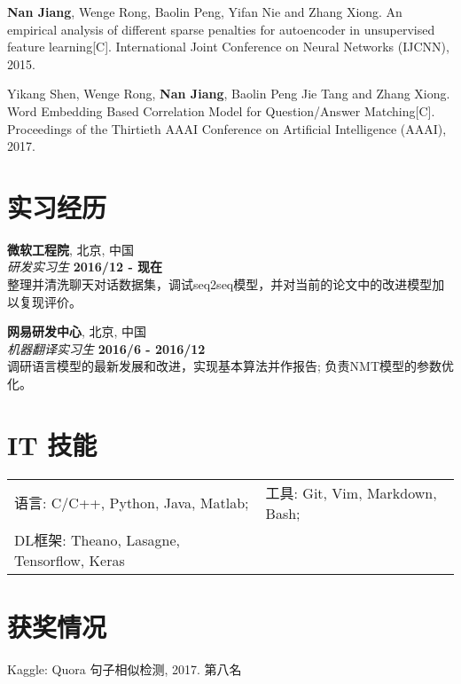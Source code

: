 \documentclass[margin,line]{resume}
\begin{document}
\begin{resume}
\textbf{Nan Jiang}, Wenge Rong, Baolin Peng, Yifan Nie and Zhang Xiong. An empirical analysis of different sparse penalties for autoencoder in unsupervised feature learning[C]. International Joint Conference on Neural Networks (IJCNN), 2015.

Yikang Shen, Wenge Rong, \textbf{Nan Jiang}, Baolin Peng Jie Tang and Zhang Xiong. Word Embedding Based Correlation Model for Question/Answer Matching[C]. Proceedings of the Thirtieth {AAAI} Conference on Artificial Intelligence (AAAI), 2017.





\section{实习经历}
{\bf 微软工程院}, 北京, 中国 \\
{\em 研发实习生} \hfill {\bf  2016/12 - 现在}\\
整理并清洗聊天对话数据集，调试seq2seq模型，并对当前的论文中的改进模型加以复现评价。
\vspace{-0.5em}

{\bf 网易研发中心}, 北京, 中国 \\
{\em 机器翻译实习生} \hfill {\bf  2016/6 - 2016/12}\\
调研语言模型的最新发展和改进，实现基本算法并作报告; 负责NMT模型的参数优化。








\section{IT 技能}
\begin{tabular}{@{}p{3in}p{4in}}
语言: C/C++, Python, Java, Matlab;& 工具: Git, Vim, Markdown, Bash; \\
DL框架: Theano, Lasagne, Tensorflow, Keras  &  
\end{tabular}



\section{获奖情况}
Kaggle: Quora 句子相似检测, 2017. 第八名


\end{resume}
\end{document}
